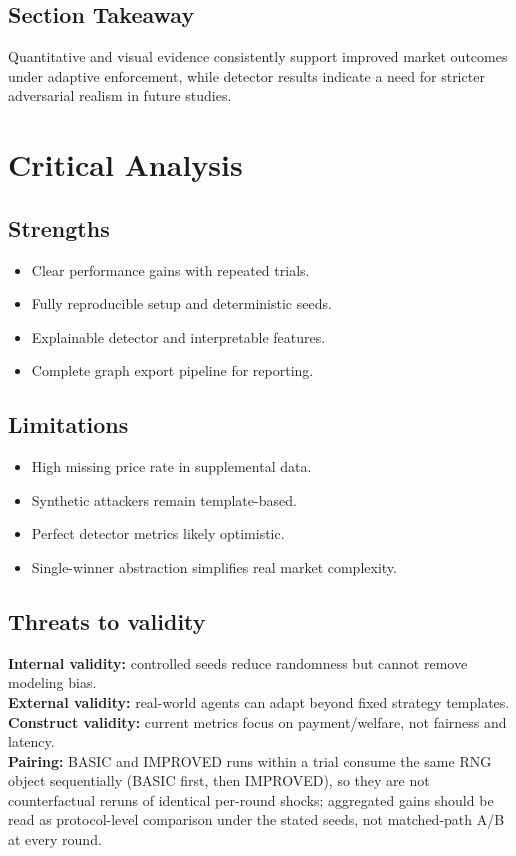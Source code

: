 \documentclass[journal]{IEEEtran}
\begin{document}
\subsection{Section Takeaway}
Quantitative and visual evidence consistently support improved market outcomes under adaptive enforcement, while detector results indicate a need for stricter adversarial realism in future studies.

\section{Critical Analysis}
\subsection{Strengths}
\begin{itemize}[leftmargin=*]
    \item Clear performance gains with repeated trials.
    \item Fully reproducible setup and deterministic seeds.
    \item Explainable detector and interpretable features.
    \item Complete graph export pipeline for reporting.
\end{itemize}

\subsection{Limitations}
\begin{itemize}[leftmargin=*]
    \item High missing price rate in supplemental data.
    \item Synthetic attackers remain template-based.
    \item Perfect detector metrics likely optimistic.
    \item Single-winner abstraction simplifies real market complexity.
\end{itemize}

\subsection{Threats to validity}
\textbf{Internal validity:} controlled seeds reduce randomness but cannot remove modeling bias.\\
\textbf{External validity:} real-world agents can adapt beyond fixed strategy templates.\\
\textbf{Construct validity:} current metrics focus on payment/welfare, not fairness and latency.\\
\textbf{Pairing:} BASIC and IMPROVED runs within a trial consume the same RNG object sequentially (BASIC first, then IMPROVED), so they are not counterfactual reruns of identical per-round shocks; aggregated gains should be read as protocol-level comparison under the stated seeds, not matched-path A/B at every round.
\end{document}
